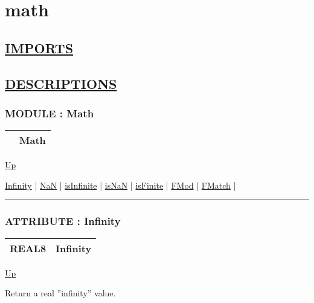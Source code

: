 \chapter*{math}
\hypertarget{ecldoc:toc:math}{}

\section*{\underline{IMPORTS}}

\section*{\underline{DESCRIPTIONS}}
\subsection*{MODULE : Math}
\hypertarget{ecldoc:Math}{}

{\renewcommand{\arraystretch}{1.5}
\begin{tabularx}{\textwidth}{|>{\raggedright\arraybackslash}l|X|}
\hline
\hspace{0pt} & Math \\
\hline
\end{tabularx}
}

\hyperlink{ecldoc:toc:root}{Up}

\par


\hyperlink{ecldoc:math.infinity}{Infinity}  |
\hyperlink{ecldoc:math.nan}{NaN}  |
\hyperlink{ecldoc:math.isinfinite}{isInfinite}  |
\hyperlink{ecldoc:math.isnan}{isNaN}  |
\hyperlink{ecldoc:math.isfinite}{isFinite}  |
\hyperlink{ecldoc:math.fmod}{FMod}  |
\hyperlink{ecldoc:math.fmatch}{FMatch}  |

\rule{\textwidth}{0.4pt}

\subsection*{ATTRIBUTE : Infinity}
\hypertarget{ecldoc:math.infinity}{}

{\renewcommand{\arraystretch}{1.5}
\begin{tabularx}{\textwidth}{|>{\raggedright\arraybackslash}l|X|}
\hline
\hspace{0pt}REAL8 & Infinity \\
\hline
\end{tabularx}
}

\hyperlink{ecldoc:Math}{Up}

\par
Return a real ''infinity'' value.


